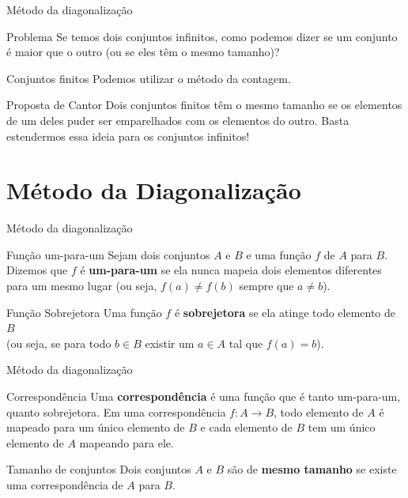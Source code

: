 \documentclass[xcolor=dvipsnames,table]{beamer}
\begin{document}
	\begin{frame}{Método da diagonalização}
		\begin{alertblock}{Problema}
			Se temos dois conjuntos infinitos, como podemos dizer se um conjunto é maior que o outro (ou se eles têm o mesmo tamanho)?
		\end{alertblock}
		\begin{block}{Conjuntos finitos}
			Podemos utilizar o método da contagem.
		\end{block} \pause
		\begin{exampleblock}{Proposta de Cantor}
			Dois conjuntos finitos têm o mesmo tamanho se os elementos de um deles puder ser emparelhados com os elementos do outro. Basta estendermos essa ideia para os conjuntos infinitos!
		\end{exampleblock}
	\end{frame}
	
	\section{Método da Diagonalização}
	
	\begin{frame}{Método da diagonalização}
		\begin{block}{Função um-para-um}
			Sejam dois conjuntos $A$ e $B$ e uma função $f$ de $A$ para $B$. Dizemos que $f$ é {\bf um-para-um} se ela nunca mapeia dois elementos diferentes para um mesmo lugar (ou seja, $f(a) \not= f(b)$ sempre que $a \not= b$).
		\end{block}	\pause	
		\begin{block}{Função Sobrejetora}		
			Uma função $f$ é {\bf sobrejetora} se ela atinge todo elemento de $B$ \\(ou seja, se para todo $b \in B$ existir um $a \in A$ tal que $f(a) = b$).
		\end{block} 
	\end{frame}
	
	\begin{frame}{Método da diagonalização}
		\begin{block}{Correspondência}
			Uma {\bf correspondência} é uma função que é tanto um-para-um, quanto sobrejetora. Em uma correspondência $f : A \rightarrow B$, todo elemento de $A$ é mapeado para um único elemento de $B$ e cada elemento de $B$ tem um único elemento de $A$ mapeando para ele. 
		\end{block} \pause
		\begin{block}{Tamanho de conjuntos}
			Dois conjuntos $A$ e $B$ são de {\bf mesmo tamanho} se existe uma correspondência de $A$ para $B$.
		\end{block}
	\end{frame}
	
\end{document}
